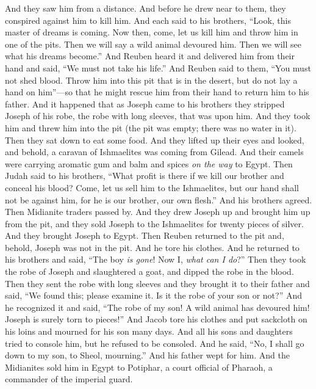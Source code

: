 \begin{biblechapter}
\verse And they saw him from a distance. And before he drew near to them, they conspired against him to kill him.
\verse And each said to his brothers, “Look, this master of dreams is coming.
\verse Now then, come, let us kill him and throw him in one of the pits. Then we will say a wild animal devoured him. Then we will see what his dreams become.”
\verse And Reuben heard it and delivered him from their hand and said, “We must not take his life.”
\verse And Reuben said to them, “You must not shed blood. Throw him into this pit that is in the desert, but do not lay a hand on him”—so that he might rescue him from their hand to return him to his father.
\verse And it happened that as Joseph came to his brothers they stripped Joseph of his robe, the robe with long sleeves, that was upon him.
\verse And they took him and threw him into the pit (the pit was empty; there was no water in it).
\verse Then they sat down to eat some food. And they lifted up their eyes and looked, and behold, a caravan of Ishmaelites was coming from Gilead. And their camels were carrying aromatic gum and balm and spices \textit{on the way} to Egypt.
\verse Then Judah said to his brothers, “What profit is there if we kill our brother and conceal his blood?
\verse Come, let us sell him to the Ishmaelites, but our hand shall not be against him, for he is our brother, our own flesh.” And his brothers agreed.
\verse Then Midianite traders passed by. And they drew Joseph up and brought him up from the pit, and they sold Joseph to the Ishmaelites for twenty pieces of silver. And they brought Joseph to Egypt.
\verse Then Reuben returned to the pit and, behold, Joseph was not in the pit. And he tore his clothes.
\verse And he returned to his brothers and said, “The boy \textit{is gone}! Now I, \textit{what can I do}?”
\verse Then they took the robe of Joseph and slaughtered a goat, and dipped the robe in the blood.
\verse Then they sent the robe with long sleeves and they brought it to their father and said, “We found this; please examine it. Is it the robe of your son or not?”
\verse And he recognized it and said, “The robe of my son! A wild animal has devoured him! Joseph is surely torn to pieces!”
\verse And Jacob tore his clothes and put sackcloth on his loins and mourned for his son many days.
\verse And all his sons and daughters tried to console him, but he refused to be consoled. And he said, “No, I shall go down to my son, to Sheol, mourning.” And his father wept for him.
\verse And the Midianites sold him in Egypt to Potiphar, a court official of Pharaoh, a commander of the imperial guard.
\end{biblechapter}


